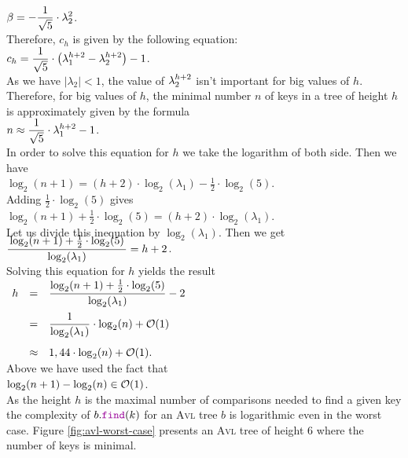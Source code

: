 \\[0.2cm]
\hspace*{1.3cm}
$\displaystyle \beta  = -\frac{1}{\sqrt{5}} \cdot \lambda_2^2$.
\\[0.2cm]
Therefore, $c_h$ is given by the following equation:
\\[0.2cm]
\hspace*{1.3cm}
$c_h = \displaystyle \frac{1}{\sqrt{5}} \cdot \left( \lambda_1^{h+2} - \lambda_2^{h+2} \right) -1$.  
\\[0.2cm]
As we have  $|\lambda_2| < 1$, the value of  $\displaystyle\lambda_2^{h+2}$ isn't important for big
values of $h$.  Therefore, for big values of $h$, the minimal number  $n$ of keys in a tree of
height  $h$ is approximately given by the formula \\[0.2cm]
\hspace*{1.3cm} $n \approx \displaystyle \frac{1}{\sqrt{5}} \cdot \lambda_1^{h+2} - 1$. \\[0.2cm]
In order to solve this equation for  $h$ we take the logarithm of both side.  Then we have
\\[0.2cm]
\hspace*{1.3cm}
$\log_2(n+1) = (h+2) \cdot \log_2(\lambda_1) - \frac{1}{2}\cdot \log_2(5)$.
\\[0.2cm]
Adding  $\frac{1}{2}\cdot \log_2(5)$ gives
\\[0.2cm]
\hspace*{1.3cm}
$\log_2(n+1) + \frac{1}{2}\cdot \log_2(5) = (h+2) \cdot \log_2(\lambda_1)$.
\\[0.2cm]
Let us divide this inequation by  $\log_2(\lambda_1)$.  Then we get
\\[0.4cm]
\hspace*{1.3cm}
$\ds \bruch{\log_2(n+1) + \frac{1}{2}\cdot \log_2(5)}{\log_2(\lambda_1)} = h+2$.
\\[0.2cm]
Solving this equation for  $h$ yields the result 
\\[0.4cm]
\hspace*{1.3cm} 
$
\begin{array}[t]{lcl}
h & = & \displaystyle \frac{\log_2(n+1) + \frac{1}{2}\cdot \log_2(5)}{\log_2(\lambda_1)} - 2 \\[0.4cm]
  & = & \displaystyle \frac{1}{\log_2(\lambda_1)}\cdot \log_2(n) + \mathcal{O}(1) \\[0.5cm]
  & \approx & 1,44 \cdot \log_2(n) + \mathcal{O}(1).
\end{array} 
$
\\[0.2cm]
Above we have used the fact that 
\\[0.2cm]
\hspace*{1.3cm}
$\log_2(n+1) - \log_2(n) \in \mathcal{O}(1)$. 
\\[0.2cm]
As the height $h$ is the maximal number of comparisons needed to find a given key
the complexity of $b.\mytt{find}(k)$ for an \textsc{Avl} tree $b$ is logarithmic even in the worst case.
Figure 
\ref{fig:avl-worst-case} presents an  \textsc{Avl} tree of height 6 where the number of keys is minimal.



